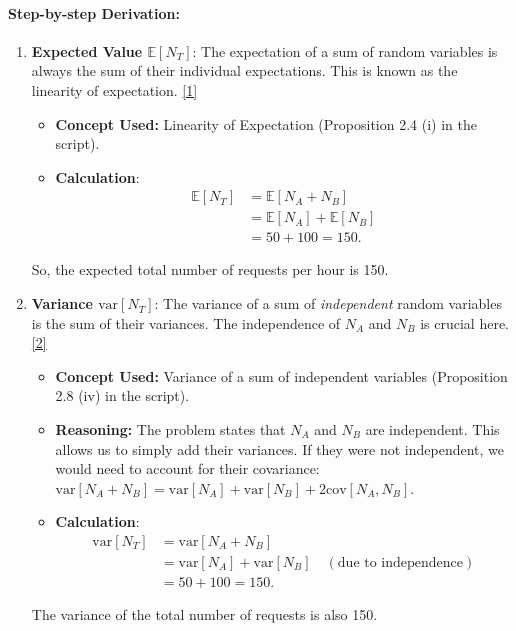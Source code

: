 \documentclass[11pt,a4paper]{article}
\begin{document}
\paragraph{Step-by-step Derivation:}
\begin{enumerate}
    \item \textbf{Expected Value $\mathbb{E}[N_T]$}: The expectation of a sum of random variables is always the sum of their individual expectations. This is known as the linearity of expectation.
    \hyperlink{concept1}{[1]}
    \begin{itemize}
        \item \textbf{Concept Used:} Linearity of Expectation (Proposition 2.4 (i) in the script).
        \item \textbf{Calculation}:
        \begin{align*}
            \mathbb{E}[N_T] &= \mathbb{E}[N_A + N_B] \\
            &= \mathbb{E}[N_A] + \mathbb{E}[N_B] \\
            &= 50 + 100 = 150.
        \end{align*}
    \end{itemize}
    So, the expected total number of requests per hour is 150.

    \item \textbf{Variance $\text{var}[N_T]$}: The variance of a sum of \textit{independent} random variables is the sum of their variances. The independence of $N_A$ and $N_B$ is crucial here.
    \hyperlink{concept2}{[2]}
    \begin{itemize}
        \item \textbf{Concept Used:} Variance of a sum of independent variables (Proposition 2.8 (iv) in the script).
        \item \textbf{Reasoning:} The problem states that $N_A$ and $N_B$ are independent. This allows us to simply add their variances. If they were not independent, we would need to account for their covariance: $\text{var}[N_A + N_B] = \text{var}[N_A] + \text{var}[N_B] + 2\text{cov}[N_A, N_B]$.
        \item \textbf{Calculation}:
        \begin{align*}
            \text{var}[N_T] &= \text{var}[N_A + N_B] \\
            &= \text{var}[N_A] + \text{var}[N_B] \quad (\text{due to independence}) \\
            &= 50 + 100 = 150.
        \end{align*}
    \end{itemize}
    The variance of the total number of requests is also 150.
\end{enumerate}
\end{document}
